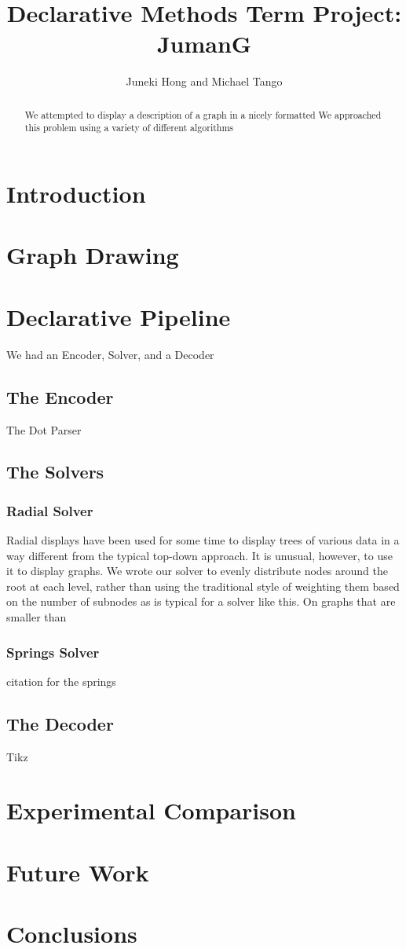\documentclass{article}
\title{Declarative Methods Term Project: \\ JumanG}
\author{Juneki Hong and Michael Tango}
\date{}
\begin{document}
\maketitle

\begin{abstract}
We attempted to display a description of a graph in a nicely formatted 
We approached this problem using a variety of different algorithms
\end{abstract}

\section{Introduction}

\section{Graph Drawing}


\section{Declarative Pipeline}

We had an Encoder, Solver, and a Decoder

\subsection{The Encoder}
The Dot Parser

\subsection{The Solvers}

\subsubsection{Radial Solver}
Radial displays have been used for some time to display trees of various data in a way different from the typical top-down approach.
It is unusual, however, to use it to display graphs. We wrote our solver to evenly distribute nodes around the root at each level,
rather than using the traditional style of weighting them based on the number of subnodes as is typical for a solver like this. 
On graphs that are smaller than 

\subsubsection{Springs Solver}
citation for the springs\cite{springs}



\subsection{The Decoder}
Tikz


\section{Experimental Comparison}


\section{Future Work}


\section{Conclusions}



\end{document}
